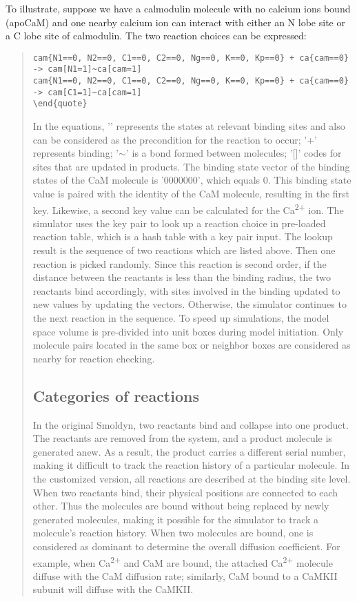 To illustrate, suppose we have a calmodulin molecule with no calcium ions bound (apoCaM) and one nearby calcium ion can interact with either an N lobe site or a C lobe site of calmodulin. The two reaction choices can be expressed:
\begin{quote}
\begin{verbatim}
cam{N1==0, N2==0, C1==0, C2==0, Ng==0, K==0, Kp==0} + ca{cam==0} -> cam[N1=1]~ca[cam=1]
cam{N1==0, N2==0, C1==0, C2==0, Ng==0, K==0, Kp==0} + ca{cam==0} -> cam[C1=1]~ca[cam=1]
\end{quote}
\end{verbatim}

In the equations, '{}' represents the states at relevant binding sites and also can be considered as the precondition for the reaction to occur; '+' represents binding; '$\sim$' is a bond formed between molecules; '[]' codes for sites that are updated in products. The binding state vector of the binding states of the CaM molecule is ’0000000’, which equals 0. This binding state value is paired with the identity of the CaM molecule, resulting in the first key. Likewise, a second key value can be calculated for the Ca\textsuperscript{2+} ion. The simulator uses the key pair to look up a reaction choice in pre-loaded reaction table, which is a hash table with a key pair input. The lookup result is the sequence of two reactions which are listed above. Then one reaction is picked randomly. Since this reaction is second order, if the distance between the reactants is less than the binding radius, the two reactants bind accordingly, with sites involved in the binding updated to new values by updating the vectors. Otherwise, the simulator continues to the next reaction in the sequence. To speed up simulations, the model space volume is pre-divided into unit boxes during model initiation. Only molecule pairs located in the same box or neighbor boxes are considered as nearby for reaction checking.

\subsection{Categories of reactions}
In the original Smoldyn, two reactants bind and collapse into one product. The reactants are removed from the system, and a product molecule is generated anew. As a result, the product carries a different serial number, making it difficult to track the reaction history of a particular molecule. In the customized version, all reactions are described at the binding site level. When two reactants bind, their physical positions are connected to each other. Thus the molecules are bound without being replaced by newly generated molecules, making it possible for the simulator to track a molecule's reaction history. When two molecules are bound, one is considered as dominant to determine the overall diffusion coefficient. For example, when Ca\textsuperscript{2+} and CaM are bound, the attached Ca\textsuperscript{2+} molecule diffuse with the CaM diffusion rate; similarly, CaM bound to a CaMKII subunit will diffuse with the CaMKII.


\end{quote}
